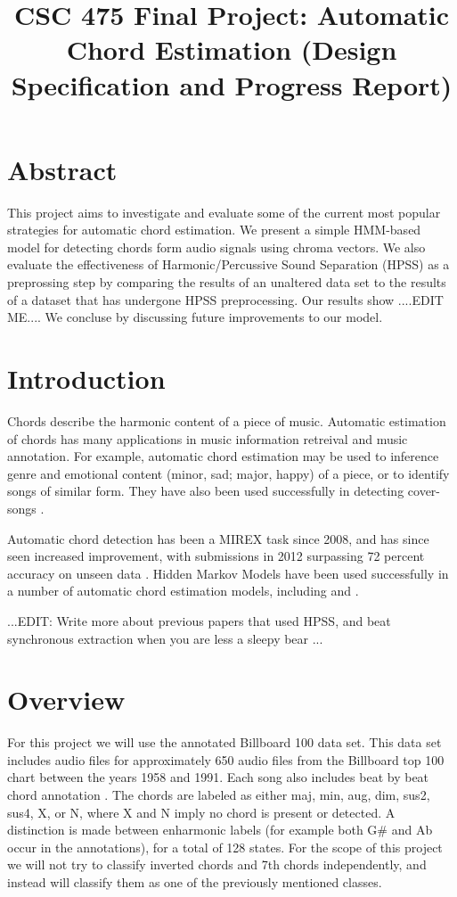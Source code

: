 \documentclass{article}
\title{CSC 475 Final Project: Automatic Chord Estimation (Design Specification and Progress Report)}
\begin{document}
%
\maketitle
%

\section{Abstract}\label{sec:desoutline}
This project aims to investigate and evaluate some of the current most popular
strategies for automatic chord estimation. We present a simple HMM-based model
for detecting chords form audio signals using chroma vectors. We also evaluate the
effectiveness of Harmonic/Percussive Sound Separation (HPSS) as a preprossing step by comparing
the results of an unaltered data set to the results of a dataset that has undergone
HPSS preprocessing. Our results show ....EDIT ME.... We concluse by discussing future improvements
to our model.

\section{Introduction}\label{sec:intro}

Chords describe the harmonic content of a piece of music. Automatic estimation of chords
has many applications in music information retreival and music annotation. For example,
automatic chord estimation may be used to inference genre and emotional content
(minor, sad; major, happy) of a piece, or to identify songs of similar form.
They have also been used successfully in detecting cover-songs \cite{Papadopoulos:18}.

Automatic chord detection has been a MIREX task since 2008, and has since seen increased
improvement, with submissions in 2012 surpassing 72 percent accuracy on unseen data
\cite{McVicar:00}. Hidden Markov Models have been used successfully in a number of
automatic chord estimation models, including \cite{Ueda:01} \cite{Lee:15} \cite{Ueda:19}
and \cite{Papadopoulos:18}.

...EDIT: Write more about previous papers that used HPSS, and beat synchronous extraction
when you are less a sleepy bear ...

\section{Overview}\label{sec:approch}

For this project we will use the annotated Billboard 100 data set. This data
set includes audio files for approximately 650 audio files from the Billboard
top 100 chart between the years 1958 and 1991. Each song also includes beat by
beat chord annotation \cite{Burgoyne:07}. The chords are labeled as either maj,
min, aug, dim, sus2, sus4, X, or N, where X and N imply no chord is present or
detected. A distinction is made between enharmonic labels (for example both
G\# and Ab occur in the annotations), for a total of 128 states.
For the scope of this project we will not try to classify inverted
chords and 7th chords independently, and instead will classify them as one of
the previously mentioned classes.
\end{document}
